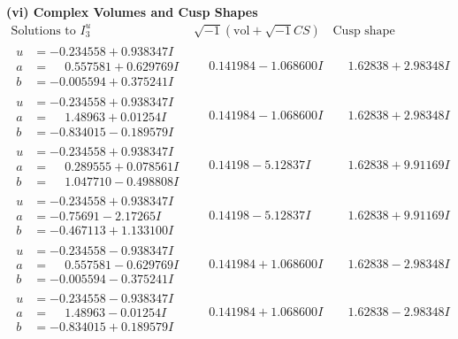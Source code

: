 \documentclass[1p]{elsarticle_modified}
\theoremstyle{definition}
\newcommand{\I}{\sqrt{-1}}
\begin{document}
\newpage\flushleft \textbf{(vi) Complex Volumes and Cusp Shapes}
$$\begin{array}{c|c|c}  
\text{Solutions to }I^u_{3}& \I (\text{vol} + \sqrt{-1}CS) & \text{Cusp shape}\\
 \hline 
\begin{aligned}
u &= -0.234558 + 0.938347 I \\
a &= \phantom{-}0.557581 + 0.629769 I \\
b &= -0.005594 + 0.375241 I\end{aligned}
 & \phantom{-}0.141984 - 1.068600 I & \phantom{-}1.62838 + 2.98348 I \\ \hline\begin{aligned}
u &= -0.234558 + 0.938347 I \\
a &= \phantom{-}1.48963 + 0.01254 I \\
b &= -0.834015 - 0.189579 I\end{aligned}
 & \phantom{-}0.141984 - 1.068600 I & \phantom{-}1.62838 + 2.98348 I \\ \hline\begin{aligned}
u &= -0.234558 + 0.938347 I \\
a &= \phantom{-}0.289555 + 0.078561 I \\
b &= \phantom{-}1.047710 - 0.498808 I\end{aligned}
 & \phantom{-}0.14198 - 5.12837 I & \phantom{-}1.62838 + 9.91169 I \\ \hline\begin{aligned}
u &= -0.234558 + 0.938347 I \\
a &= -0.75691 - 2.17265 I \\
b &= -0.467113 + 1.133100 I\end{aligned}
 & \phantom{-}0.14198 - 5.12837 I & \phantom{-}1.62838 + 9.91169 I \\ \hline\begin{aligned}
u &= -0.234558 - 0.938347 I \\
a &= \phantom{-}0.557581 - 0.629769 I \\
b &= -0.005594 - 0.375241 I\end{aligned}
 & \phantom{-}0.141984 + 1.068600 I & \phantom{-}1.62838 - 2.98348 I \\ \hline\begin{aligned}
u &= -0.234558 - 0.938347 I \\
a &= \phantom{-}1.48963 - 0.01254 I \\
b &= -0.834015 + 0.189579 I\end{aligned}
 & \phantom{-}0.141984 + 1.068600 I & \phantom{-}1.62838 - 2.98348 I \\ \hline\begin{aligned}

\end{aligned}
\end{array}$$
\end{document}
